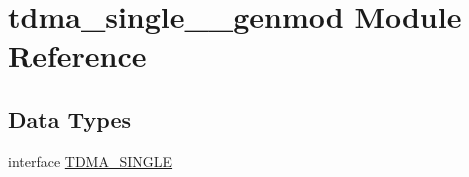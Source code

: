 \hypertarget{namespacetdma__single____genmod}{}\section{tdma\+\_\+single\+\_\+\+\_\+genmod Module Reference}
\label{namespacetdma__single____genmod}
\subsection*{Data Types}
\begin{DoxyCompactItemize}
\item 
interface \mbox{\hyperlink{interfacetdma__single____genmod_1_1_t_d_m_a___s_i_n_g_l_e}{T\+D\+M\+A\+\_\+\+S\+I\+N\+G\+LE}}
\end{DoxyCompactItemize}
